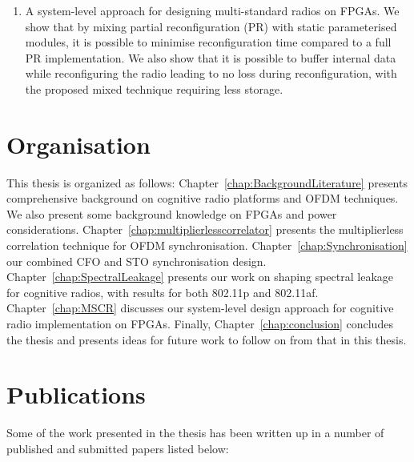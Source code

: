 \begin{enumerate}
\item A system-level approach for designing multi-standard radios on FPGAs.
We show that by mixing partial reconfiguration (PR) with static parameterised modules, it is possible to minimise reconfiguration time compared to a full PR implementation.
We also show that it is possible to buffer internal data while reconfiguring the radio leading to no loss during reconfiguration, with the proposed mixed technique requiring less storage.
\end{enumerate}

\section{Organisation}

This thesis is organized as follows:
Chapter~\ref{chap:BackgroundLiterature} presents comprehensive background on cognitive radio platforms and OFDM techniques. We also present some background knowledge on FPGAs and power considerations. Chapter~\ref{chap:multiplierlesscorrelator} presents the multiplierless correlation technique for OFDM synchronisation. Chapter~\ref{chap:Synchronisation} our combined CFO and STO synchronisation design. Chapter~\ref{chap:SpectralLeakage} presents our work on shaping spectral leakage for cognitive radios, with results for both 802.11p and 802.11af.
Chapter~\ref{chap:MSCR} discusses our system-level design approach for cognitive radio implementation on FPGAs.
Finally, Chapter~\ref{chap:conclusion} concludes the thesis and presents ideas for future work to follow on from that in this thesis.

\section{Publications}
Some of the work presented in the thesis has been written up in a number of published and submitted papers listed below:

